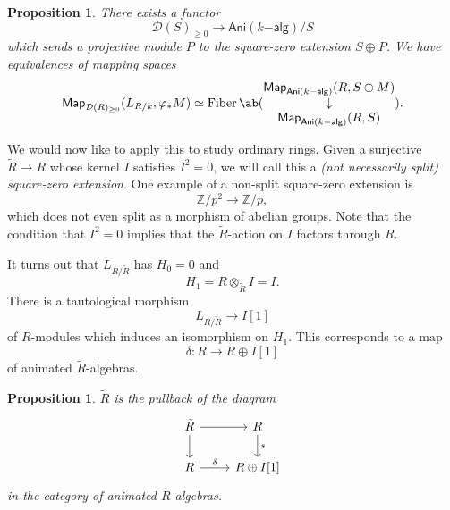 \documentclass[10pt, oneside]{memoir}
\newtheorem{prop}[thm]{Proposition}
\theoremstyle{definition}
\theoremstyle{remark}
\theoremstyle{plain}
\theoremstyle{definition}
\theoremstyle{remark}
\newcommand{\Z}{\mathbb{Z}}
\newcommand{\mc}[1]{\mathcal{#1}}
\newcommand{\on}[1]{\operatorname{#1}}
\newcommand{\ms}[1]{\mathsf{#1}}
\newcommand{\1}{\mathbf{1}}
\newcommand{\2}{\mathbf{2}}
\newcommand{\3}{\mathbf{3}}
\begin{document}
\begin{prop}
    There exists a functor
    \[ \mc{D}(S)_{\geq 0} \to \ms{Ani}(k\ms{-alg})/S \]
    which sends a projective module $P$ to the square-zero extension $S \oplus P$. We have equivalences of mapping spaces
    \[ \ms{Map}_{\mc{D}(R)_{\geq 0}} (L_{R/k}, \varphi_* M) \simeq \on{Fiber} \ab(\begin{matrix}\ms{Map}_{\ms{Ani}(k\ms{-alg})}(R, S \oplus M) \\ \downarrow \\ \ms{Map}_{\ms{Ani}(k\ms{-alg})}(R,S)\end{matrix}). \]
\end{prop}

We would now like to apply this to study ordinary rings. Given a surjective $\tilde{R} \to R$ whose kernel $I$ satisfies $I^2 = 0$, we will call this a \textit{(not necessarily split) square-zero extension}. One example of a non-split square-zero extension is
\[ \Z/p^2 \to \Z/p, \]
which does not even split as a morphism of abelian groups. Note that the condition that $I^2 = 0$ implies that the $\tilde{R}$-action on $I$ factors through $R$.

It turns out that $L_{R/\tilde{R}}$ has $H_0 = 0$ and 
\[ H_1 = R \otimes_{\tilde{R}} I = I. \]
There is a tautological morphism
\[ L_{R/\tilde{R}} \to I[1] \]
of $R$-modules which induces an isomorphism on $H_1$. This corresponds to a map
\[ \delta \colon R \to R \oplus I[1] \]
of animated $\tilde{R}$-algebras.

\begin{prop}
    $\tilde{R}$ is the pullback of the diagram
    \begin{equation*}
    \begin{tikzcd}
        \tilde{R} \ar{r} \ar{d} & R \ar{d}{s} \\
        R \ar{r}{\delta} & R \oplus I[1]
    \end{tikzcd}
    \end{equation*}
    in the category of animated $\tilde{R}$-algebras.
\end{prop}
\end{document}
